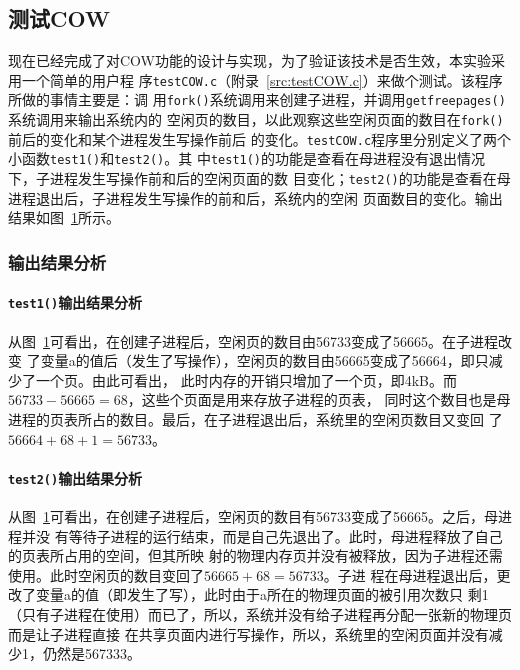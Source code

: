 \documentclass{swfcthesismscctex}
\begin{document}
\subsection{测试COW}

现在已经完成了对COW功能的设计与实现，为了验证该技术是否生效，本实验采用一个简单的用户程
序\texttt{testCOW.c}（附录~\ref{src:testCOW.c}）来做个测试。该程序所做的事情主要是：调
用\texttt{fork()}系统调用来创建子进程，并调用\texttt{getfreepages()}系统调用来输出系统内的
空闲页的数目，以此观察这些空闲页面的数目在\texttt{fork()}前后的变化和某个进程发生写操作前后
的变化。\texttt{testCOW.c}程序里分别定义了两个小函数\texttt{test1()}和\texttt{test2()}。其
中\texttt{test1()}的功能是查看在母进程没有退出情况下，子进程发生写操作前和后的空闲页面的数
目变化；\texttt{test2()}的功能是查看在母进程退出后，子进程发生写操作的前和后，系统内的空闲
页面数目的变化。输出结果如图~\ref{fig:testcow}所示。

\begin{figure}[!ht]
  \centering
  \label{fig:testcow}
\end{figure}

\subsubsection{输出结果分析}

\paragraph{\texttt{test1()}输出结果分析}

从图~\ref{fig:testcow}可看出，在创建子进程后，空闲页的数目由56733变成了56665。在子进程改变
了变量a的值后（发生了写操作），空闲页的数目由56665变成了56664，即只减少了一个页。由此可看出，
此时内存的开销只增加了一个页，即4kB。而$56733-56665=68$，这些个页面是用来存放子进程的页表，
同时这个数目也是母进程的页表所占的数目。最后，在子进程退出后，系统里的空闲页数目又变回
了$56664+68+1=56733$。

\paragraph{\texttt{test2()}输出结果分析}

从图~\ref{fig:testcow}可看出，在创建子进程后，空闲页的数目有56733变成了56665。之后，母进程并没
有等待子进程的运行结束，而是自己先退出了。此时，母进程释放了自己的页表所占用的空间，但其所映
射的物理内存页并没有被释放，因为子进程还需使用。此时空闲页的数目变回了$56665+68=56733$。子进
程在母进程退出后，更改了变量a的值（即发生了写），此时由于a所在的物理页面的被引用次数只
剩1（只有子进程在使用）而已了，所以，系统并没有给子进程再分配一张新的物理页而是让子进程直接
在共享页面内进行写操作，所以，系统里的空闲页面并没有减少1，仍然是567333。
\end{document}
